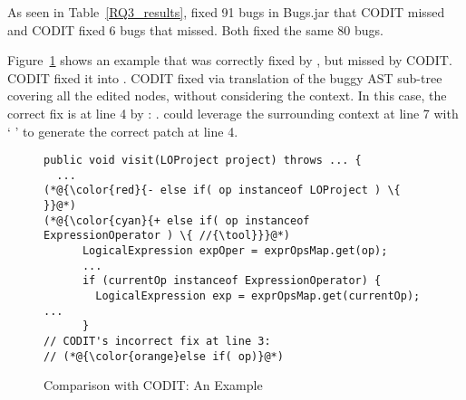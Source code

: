 As seen in Table~\ref{RQ3_results}, {\tool} fixed 91 bugs in Bugs.jar
that CODIT missed and CODIT fixed 6 bugs that {\tool} missed. Both fixed the same 80 bugs.


Figure~\ref{example_codit} shows an example that was correctly fixed
by {\tool}, but missed by CODIT. CODIT fixed it into 
 . CODIT fixed via translation of the buggy AST
sub-tree covering all the edited nodes, without considering the
context.
In this case, the correct fix is at line 4 by {\tool}: 
  
. {\tool} could leverage the surrounding
context at line 7 with ` 
' to generate the correct patch at line 4.



\begin{figure}[t]
	\centering
	\begin{lstlisting}[]
public void visit(LOProject project) throws ... {
  ...
(*@{\color{red}{- else if( op instanceof LOProject ) \{ }}@*)
(*@{\color{cyan}{+ else if( op instanceof ExpressionOperator ) \{ //{\tool}}}@*)
      LogicalExpression expOper = exprOpsMap.get(op);
      ...
      if (currentOp instanceof ExpressionOperator) {
        LogicalExpression exp = exprOpsMap.get(currentOp); ...
      }
// CODIT's incorrect fix at line 3:
// (*@{\color{orange}else if( op)}@*) 
	\end{lstlisting}
        \vspace{-17pt}
	\caption{Comparison with CODIT: An Example}
	\label{example_codit}
\end{figure}

